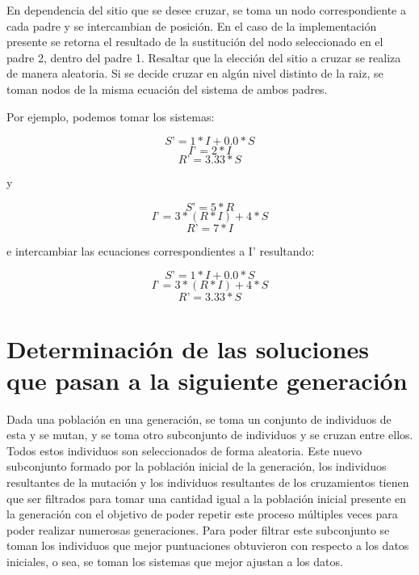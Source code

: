 En dependencia del sitio que se desee cruzar, se toma un nodo correspondiente a cada padre y se intercambian de posición. En el caso de la implementación presente se retorna el resultado de la sustitución del nodo seleccionado en el padre 2, dentro del padre 1. Resaltar que la elección del sitio a cruzar se realiza de manera aleatoria. Si se decide cruzar en algún nivel distinto de la raiz, se toman nodos de la misma ecuación del sistema de ambos padres.

Por ejemplo, podemos tomar los sistemas:

$$S’ = 1 * I + 0.0 * S$$
$$I’ = 2 * I$$
$$R’ = 3.33 * S$$

y

$$S’ = 5 * R$$
$$I’ = 3 * (R * I) + 4 * S$$
$$R’ = 7 * I$$

e intercambiar las ecuaciones correspondientes a I’ resultando:

$$S’ = 1 * I + 0.0 * S$$
$$I’ = 3 * (R * I) + 4 * S$$
$$R’ = 3.33 * S$$

\section{Determinación de las soluciones que pasan a la siguiente generación}

Dada una población en una generación, se toma un conjunto de individuos de esta y se mutan, y se toma otro subconjunto de individuos y se cruzan entre ellos. Todos estos individuos son seleccionados de forma aleatoria. Este nuevo subconjunto formado por la población inicial de la generación, los individuos resultantes de la mutación y los individuos resultantes de los cruzamientos tienen que ser filtrados para tomar una cantidad igual a la población inicial presente en la generación con el objetivo de poder repetir este proceso múltiples veces para poder realizar numerosas generaciones. Para poder filtrar este subconjunto se toman los individuos que mejor puntuaciones obtuvieron con respecto a los datos iniciales, o sea, se toman los sistemas que mejor ajustan a los datos.
